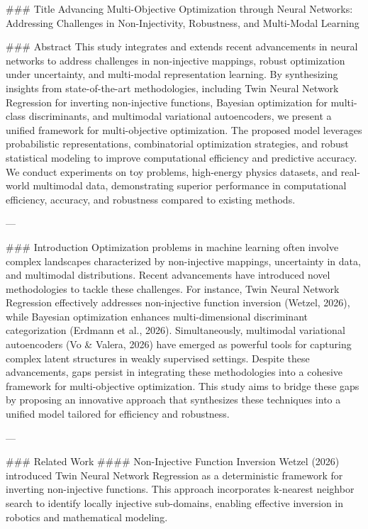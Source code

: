 ### Title
Advancing Multi-Objective Optimization through Neural Networks: Addressing Challenges in Non-Injectivity, Robustness, and Multi-Modal Learning  

### Abstract
This study integrates and extends recent advancements in neural networks to address challenges in non-injective mappings, robust optimization under uncertainty, and multi-modal representation learning. By synthesizing insights from state-of-the-art methodologies, including Twin Neural Network Regression for inverting non-injective functions, Bayesian optimization for multi-class discriminants, and multimodal variational autoencoders, we present a unified framework for multi-objective optimization. The proposed model leverages probabilistic representations, combinatorial optimization strategies, and robust statistical modeling to improve computational efficiency and predictive accuracy. We conduct experiments on toy problems, high-energy physics datasets, and real-world multimodal data, demonstrating superior performance in computational efficiency, accuracy, and robustness compared to existing methods.  

---

### Introduction
Optimization problems in machine learning often involve complex landscapes characterized by non-injective mappings, uncertainty in data, and multimodal distributions. Recent advancements have introduced novel methodologies to tackle these challenges. For instance, Twin Neural Network Regression effectively addresses non-injective function inversion (Wetzel, 2026), while Bayesian optimization enhances multi-dimensional discriminant categorization (Erdmann et al., 2026). Simultaneously, multimodal variational autoencoders (Vo & Valera, 2026) have emerged as powerful tools for capturing complex latent structures in weakly supervised settings. Despite these advancements, gaps persist in integrating these methodologies into a cohesive framework for multi-objective optimization. This study aims to bridge these gaps by proposing an innovative approach that synthesizes these techniques into a unified model tailored for efficiency and robustness.

---

### Related Work
#### Non-Injective Function Inversion
Wetzel (2026) introduced Twin Neural Network Regression as a deterministic framework for inverting non-injective functions. This approach incorporates k-nearest neighbor search to identify locally injective sub-domains, enabling effective inversion in robotics and mathematical modeling.

